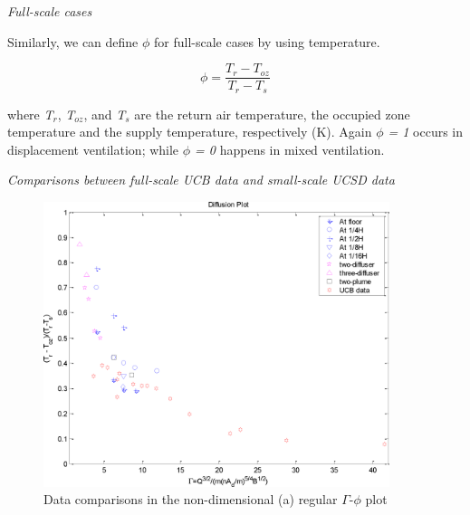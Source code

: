 {\emph{Full-scale cases}

Similarly, we can define \emph{\(\phi\)} for full-scale cases by using temperature.

\begin{equation}
\phi  = \frac{{{T_r} - {T_{oz}}}}{{{T_r} - {T_s}}}
\label{eq:PhiFullScaleCases}
\end{equation}

where \emph{T\(_{r}\)}, \emph{T\(_{oz}\)}, and \emph{T\(_{s}\)} are the return air temperature, the occupied zone temperature and the supply temperature, respectively (K). Again \emph{\(\phi\) = 1} occurs in displacement ventilation; while \emph{\(\phi\) = 0} happens in mixed ventilation.

\emph{Comparisons between full-scale UCB data and small-scale UCSD data}

\begin{figure}[hbtp] %
\centering
\includegraphics[width=0.9\textwidth, height=0.9\textheight, keepaspectratio=true]{media/image2469.png}
\caption{Data comparisons in the non-dimensional (a) regular \(\Gamma\)-\(\phi\) plot \protect \label{fig:data-comparisons-in-the-non-dimensional-a}}
\end{figure}

}
